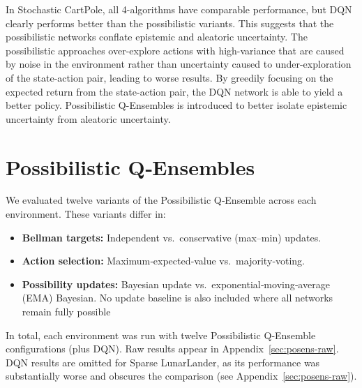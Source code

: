 \documentclass[11pt,a4paper]{report}
\begin{document}
In Stochastic CartPole, all 4-algorithms have comparable performance, but DQN clearly performs better than the possibilistic variants. This suggests that the possibilistic networks conflate epistemic and aleatoric uncertainty. The possibilistic approaches over-explore actions with high-variance that are caused by noise in the environment rather than uncertainty caused to under-exploration of the state-action pair, leading to worse results. By greedily focusing on the expected return from the state-action pair, the DQN network is able to yield a better policy. Possibilistic Q-Ensembles is introduced to better isolate epistemic uncertainty from aleatoric uncertainty. 

\section{Possibilistic Q‐Ensembles}


We evaluated twelve variants of the Possibilistic Q‐Ensemble across each environment. These variants differ in:

\begin{itemize}
  \item \textbf{Bellman targets:} Independent vs.\ conservative (max–min) updates.
  \item \textbf{Action selection:} Maximum‐expected‐value vs.\ majority‐voting.
  \item \textbf{Possibility updates:} Bayesian update vs.\ exponential‐moving‐average (EMA) Bayesian. No update baseline is also included where all networks remain fully possible
\end{itemize}

 In total, each environment was run with twelve Possibilistic Q‐Ensemble configurations (plus DQN).  Raw results appear in Appendix~\ref{sec:posens-raw}.  DQN results are omitted for Sparse LunarLander, as its performance was substantially worse and obscures the comparison (see Appendix~\ref{sec:posens-raw}).
%
\end{document}
